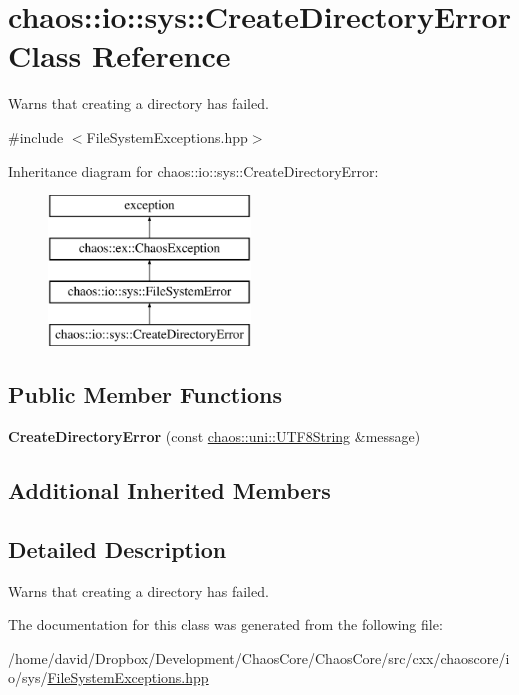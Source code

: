 \hypertarget{classchaos_1_1io_1_1sys_1_1_create_directory_error}{\section{chaos\-:\-:io\-:\-:sys\-:\-:Create\-Directory\-Error Class Reference}
\label{classchaos_1_1io_1_1sys_1_1_create_directory_error}
}


Warns that creating a directory has failed.  




{\ttfamily \#include $<$File\-System\-Exceptions.\-hpp$>$}

Inheritance diagram for chaos\-:\-:io\-:\-:sys\-:\-:Create\-Directory\-Error\-:\begin{figure}[H]
\begin{center}
\leavevmode
\includegraphics[height=4.000000cm]{classchaos_1_1io_1_1sys_1_1_create_directory_error}
\end{center}
\end{figure}
\subsection*{Public Member Functions}
\begin{DoxyCompactItemize}
\item 
\hypertarget{classchaos_1_1io_1_1sys_1_1_create_directory_error_aab9a24330c9607be0391dbbe08149fcf}{{\bfseries Create\-Directory\-Error} (const \hyperlink{classchaos_1_1uni_1_1_u_t_f8_string}{chaos\-::uni\-::\-U\-T\-F8\-String} \&message)}\label{classchaos_1_1io_1_1sys_1_1_create_directory_error_aab9a24330c9607be0391dbbe08149fcf}

\end{DoxyCompactItemize}
\subsection*{Additional Inherited Members}


\subsection{Detailed Description}
Warns that creating a directory has failed. 

The documentation for this class was generated from the following file\-:\begin{DoxyCompactItemize}
\item 
/home/david/\-Dropbox/\-Development/\-Chaos\-Core/\-Chaos\-Core/src/cxx/chaoscore/io/sys/\hyperlink{_file_system_exceptions_8hpp}{File\-System\-Exceptions.\-hpp}\end{DoxyCompactItemize}
